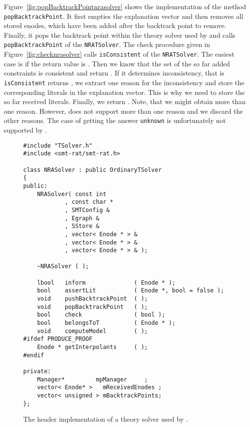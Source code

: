 Figure~\ref{fig:popBacktrackPointnrasolver} shows the implementation
of the method \texttt{popBacktrackPoint}. It first empties the explanation vector and then
removes all stored enodes, which have been added after the backtrack point to remove.
Finally, it pops the backtrack point within the theory solver used by \opensmt and
calls \texttt{popBacktrackPoint} of the \texttt{NRATSolver}. The check procedure
given in Figure~\ref{fig:checknrasolver} calls \texttt{isConsistent} of
the \texttt{NRATSolver}. The easiest case is if the return value is \true.
Then we know that the set of the so far added constraints is consistent and return
\true. If it determines inconsistency, that is \texttt{isConsistent} returns
\false, we extract one reason for the inconsistency and store the 
corresponding literals in the explanation vector. This is why we need to store
the so far received literals. Finally, we return \false. Note, that we might obtain 
more than one reason. However, \opensmt does not support more than one reason and 
we discard the other reasons. The case of getting the answer \texttt{unknown} is 
unfortunately not supported by \opensmt.


\begin{figure}[htb]
\caption{The header implementation of a theory solver used by \opensmt.}
\label{fig:headernrasolver}
\begin{verbatim}
#include "TSolver.h"
#include <smt-rat/smt-rat.h>

class NRASolver : public OrdinaryTSolver
{
public:
    NRASolver( const int           
          	, const char *        
      	    , SMTConfig &         
      	    , Egraph &            
      	    , SStore &
      	    , vector< Enode * > & 
      	    , vector< Enode * > & 
          	, vector< Enode * > & );

  	~NRASolver ( );

  	lbool   inform              ( Enode * );               
  	bool    assertLit           ( Enode *, bool = false ); 
  	void    pushBacktrackPoint  ( );                       
  	void    popBacktrackPoint   ( );                       
  	bool    check               ( bool );                  
  	bool    belongsToT          ( Enode * );               
  	void    computeModel        ( );                       
#ifdef PRODUCE_PROOF
  	Enode * getInterpolants     ( );
#endif

private:
    Manager*         mpManager     ;
    vector< Enode* >   mReceivedEnodes ;
    vector< unsigned > mBacktrackPoints;
};
\end{verbatim}
\end{figure}

